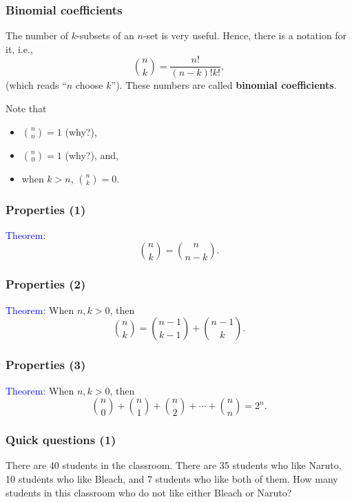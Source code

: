 \begin{frame}\frametitle{Binomial coefficients}
  The number of $k$-subsets of an $n$-set is very useful.  Hence,
  there is a notation for it, i.e.,
  \[
  {n\choose k} = \frac{n!}{(n-k)!k!},
  \]
  (which reads ``$n$ choose $k$'').  These numbers are called {\bf
    binomial coefficients}. \pause

  \vspace{0.1in}
  
  Note that
  \begin{itemize}
  \item ${n\choose n}=1$ (why?), \pause
  \item ${n\choose 0}=1$ (why?), \pause and,
  \item when $k>n$, ${n\choose k}=0$.
  \end{itemize}
\end{frame}

\begin{frame}\frametitle{Properties (1)}
  \textcolor{blue}{Theorem:} $${n\choose k}={n\choose n-k}.$$

  \vspace{2.5in}
\end{frame}

\begin{frame}\frametitle{Properties (2)}
  \textcolor{blue}{Theorem:} When $n,k>0$, then
  $${n\choose k}={n-1\choose k-1} + {n-1\choose k}.$$

  \vspace{2.5in}
\end{frame}

\begin{frame}\frametitle{Properties (3)}
  \textcolor{blue}{Theorem:} When $n,k>0$, then
  $${n\choose 0}+{n\choose 1}+{n\choose 2}+\cdots+{n\choose n}=2^n.$$

  \vspace{2.5in}
\end{frame}

\begin{frame}\frametitle{Quick questions (1)}
  \begin{tcolorbox}
    There are 40 students in the classroom.  There are 35 students who
    like Naruto, 10 students who like Bleach, and 7 students who like
    both of them.  How many students in this classroom who do not like
    either Bleach or Naruto?
  \end{tcolorbox}

  \vspace{2in}
\end{frame}

